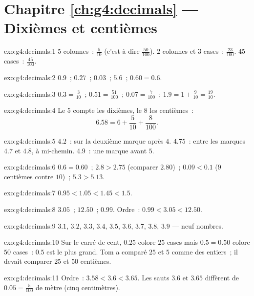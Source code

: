 \section*{Chapitre \ref{ch:g4:decimals} --- Dixièmes et centièmes}

\begin{solution}{exo:g4:decimals:1}
$5$ colonnes~: $\frac{5}{10}$ (c'est-à-dire $\frac{50}{100}$).
$2$ colonnes et $3$ cases~: $\frac{23}{100}$. $45$ cases~:
$\frac{45}{100}$.
\end{solution}

\begin{solution}{exo:g4:decimals:2}
$0.9$~; \quad $0.27$~; \quad $0.03$~; \quad $5.6$~; \quad
$0.60 = 0.6$.
\end{solution}

\begin{solution}{exo:g4:decimals:3}
$0.3 = \frac{3}{10}$~; \quad $0.51 = \frac{51}{100}$~; \quad
$0.07 = \frac{7}{100}$~; \quad $1.9 = 1 + \frac{9}{10} =
\frac{19}{10}$.
\end{solution}

\begin{solution}{exo:g4:decimals:4}
Le $5$ compte les dixièmes, le $8$ les centièmes~:
\[
6.58 = 6 + \frac{5}{10} + \frac{8}{100}.
\]
\end{solution}

\begin{solution}{exo:g4:decimals:5}
$4.2$~: sur la deuxième marque après $4$. $4.75$~: entre les
marques $4.7$ et $4.8$, à mi-chemin. $4.9$~: une marque avant $5$.
\end{solution}

\begin{solution}{exo:g4:decimals:6}
$0.6 = 0.60$~; \quad $2.8 > 2.75$ (comparer $2.80$)~; \quad
$0.09 < 0.1$ ($9$ centièmes contre $10$)~; \quad
$5.3 > 5.13$.
\end{solution}

\begin{solution}{exo:g4:decimals:7}
$0.95 < 1.05 < 1.45 < 1.5$.
\end{solution}

\begin{solution}{exo:g4:decimals:8}
$3.05$~; \quad $12.50$~; \quad $0.99$. Ordre~:
$0.99 < 3.05 < 12.50$.
\end{solution}

\begin{solution}{exo:g4:decimals:9}
$3.1$, $3.2$, $3.3$, $3.4$, $3.5$, $3.6$, $3.7$, $3.8$, $3.9$ ---
neuf nombres.
\end{solution}

\begin{solution}{exo:g4:decimals:10}
Sur le carré de cent, $0.25$ colore $25$ cases mais $0.5 = 0.50$
colore $50$ cases~: $0.5$ est le plus grand. Tom a comparé $25$ et
$5$ comme des entiers~; il devait comparer $25$ et $50$ centièmes.
\end{solution}

\begin{solution}{exo:g4:decimals:11}
Ordre~: $3.58 < 3.6 < 3.65$. Les sauts $3.6$ et $3.65$ diffèrent de
$0.05 = \frac{5}{100}$ de mètre (cinq centimètres).
\end{solution}
